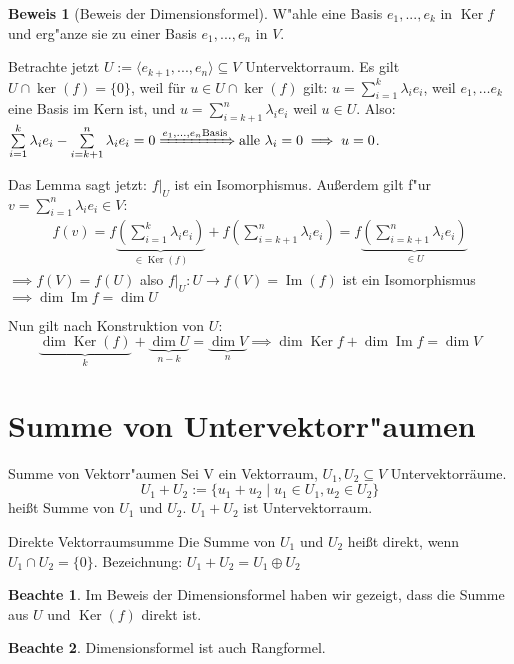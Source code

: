 \documentclass[oneside,fontsize=11pt,paper=a4,BCOR=0mm,DIV=12,automark,headsepline]{scrbook}
\DeclareMathOperator{\mdim}{dim}
\DeclareMathOperator{\mKer}{Ker}
\DeclareMathOperator{\mIm}{Im}
\theoremstyle{remark}
\theoremstyle{definition}
\newtheorem*{notte}{Beachte}
\theoremstyle{definition}
\newtheorem*{prof}{Beweis}
\theoremstyle{remark}
\begin{document}
\begin{prof}[Beweis der Dimensionsformel]
  W"ahle eine Basis \({e_1, ..., e_k}\) in \(\mKer f\) und erg"anze sie zu einer Basis
  \({e_1, ..., e_n}\) in \(V\).

  Betrachte jetzt \(U:=\langle e_{k+1}, ..., e_n\rangle \subseteq V\) Untervektorraum. Es gilt $U \cap \ker(f) = \{0\}$, weil für $u\in U \cap \ker(f)$ gilt: \(u = \sum\limits_{i=1}^k \lambda_ie_i \), weil \(e_1, \dots e_k\) eine Basis im Kern ist, und \(u = \sum\limits_{i=k+1}^{n} \lambda_i e_i\) weil \(u\in U\). Also: \(\sum\limits_{i=1}^k \lambda_ie_i - \sum\limits_{i=k+1}^{n} \lambda_ie_i = 0 \xRightarrow{e_1,\dots, e_n \text{Basis}} \text{alle }\lambda_i = 0 \implies u =0\).

  Das Lemma sagt jetzt: \(f|_U\) ist ein Isomorphismus. Außerdem gilt f"ur \(v =\sum\limits_{i=1}^{n}\lambda_ie_i \in V:\)
  \begin{align*}
    f(v) = f\underbrace{\left(\sum_{i=1}^{k}\lambda_ie_i\right)}_{\in \mKer(f)} + f\left(\sum_{i=k+1}^{n}\lambda_ie_i\right) = f\underbrace{\left(\sum_{i=k+1}^{n} \lambda_ie_i\right)}_{\in U}
  \end{align*}
  \(\implies f(V)=f(U)\) also \(f|_U : U\to f(V) = \mIm(f) \) ist ein Isomorphismus \(\implies \mdim \mIm f = \mdim U \)

  Nun gilt nach Konstruktion von \(U\): \[\underbrace{\mdim \mKer(f)}_{k} + \underbrace{\mdim U}_{n-k} = \underbrace{\mdim V}_{n} \implies \mdim\mKer f + \mdim\mIm f = \mdim V \]
\end{prof}

\section{Summe von Untervektorr"aumen}
\label{sec:org83dfe63}
\begin{definition}{Summe von Vektorr"aumen}{}
  Sei V ein Vektorraum, $U_1, U_2 \subseteq V$ Untervektorräume.
  \[U_1 + U_2 := \{u_1+u_2 \mid u_1 \in U_1, u_2 \in U_2\}\]
  heißt Summe von $U_1$ und $U_2$.
  $U_1 + U_2$ ist Untervektorraum.
  
\end{definition}
\begin{definition}{Direkte Vektorraumsumme}{}
  Die Summe von $U_1$ und $U_2$ heißt direkt, wenn $U_1 \cap U_2 = \{0\}$. Bezeichnung: $U_1 + U_2 = U_1 \oplus U_2$
\end{definition}

\begin{notte}
	Im Beweis der Dimensionsformel haben wir gezeigt, dass die Summe aus $U$ und $\mKer(f)$ direkt ist.
\end{notte}
\begin{notte}
	Dimensionsformel ist auch Rangformel.
\end{notte}
\end{document}

